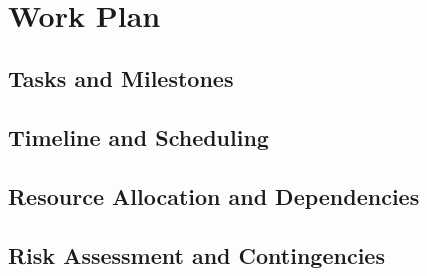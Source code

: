 
%
\   
\chapter{Work Plan}
\label{cha:work_plan}

\glsresetall

\section{Tasks and Milestones}
\label{sec:tasks_milestones}

\section{Timeline and Scheduling}
\label{sec:timeline_scheduling}

\section{Resource Allocation and Dependencies}
\label{sec:resource_allocation_dependencies}

\section{Risk Assessment and Contingencies}
\label{sec:risk_assessment_contingencies}